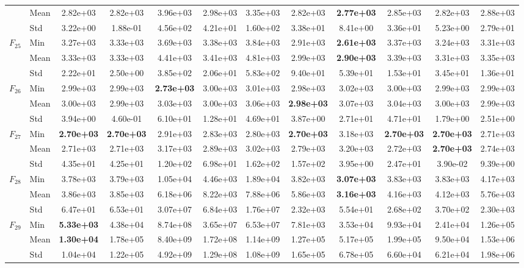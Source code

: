 \begin{center}
\begin{longtable}{clcccccccccc}
 & Mean & 2.82e+03 & 2.82e+03 & 3.96e+03 & 2.98e+03 & 3.35e+03 & 2.82e+03 & \textbf{2.77e+03} & 2.85e+03 & 2.82e+03 & 2.88e+03 \\
 & Std & 3.22e+00 & 1.88e-01 & 4.56e+02 & 4.21e+01 & 1.60e+02 & 3.38e+01 & 8.41e+00 & 3.36e+01 & 5.23e+00 & 2.79e+01 \\
\midrule
\multirow{3}{*}{$F_{25}$} & Min & 3.27e+03 & 3.33e+03 & 3.69e+03 & 3.38e+03 & 3.84e+03 & 2.91e+03 & \textbf{2.61e+03} & 3.37e+03 & 3.24e+03 & 3.31e+03 \\
 & Mean & 3.33e+03 & 3.33e+03 & 4.41e+03 & 3.41e+03 & 4.81e+03 & 2.99e+03 & \textbf{2.90e+03} & 3.39e+03 & 3.31e+03 & 3.35e+03 \\
 & Std & 2.22e+01 & 2.50e+00 & 3.85e+02 & 2.06e+01 & 5.83e+02 & 9.40e+01 & 5.39e+01 & 1.53e+01 & 3.45e+01 & 1.36e+01 \\
\midrule
\multirow{3}{*}{$F_{26}$} & Min & 2.99e+03 & 2.99e+03 & \textbf{2.73e+03} & 3.00e+03 & 3.01e+03 & 2.98e+03 & 3.02e+03 & 3.00e+03 & 2.99e+03 & 2.99e+03 \\
 & Mean & 3.00e+03 & 2.99e+03 & 3.03e+03 & 3.00e+03 & 3.06e+03 & \textbf{2.98e+03} & 3.07e+03 & 3.04e+03 & 3.00e+03 & 2.99e+03 \\
 & Std & 3.94e+00 & 4.60e-01 & 6.10e+01 & 1.28e+01 & 4.69e+01 & 3.87e+00 & 2.71e+01 & 4.71e+01 & 1.79e+00 & 2.51e+00 \\
\midrule
\multirow{3}{*}{$F_{27}$} & Min & \textbf{2.70e+03} & \textbf{2.70e+03} & 2.91e+03 & 2.83e+03 & 2.80e+03 & \textbf{2.70e+03} & 3.18e+03 & \textbf{2.70e+03} & \textbf{2.70e+03} & 2.71e+03 \\
 & Mean & 2.71e+03 & 2.71e+03 & 3.17e+03 & 2.89e+03 & 3.02e+03 & 2.79e+03 & 3.20e+03 & 2.72e+03 & \textbf{2.70e+03} & 2.74e+03 \\
 & Std & 4.35e+01 & 4.25e+01 & 1.20e+02 & 6.98e+01 & 1.62e+02 & 1.57e+02 & 3.95e+00 & 2.47e+01 & 3.90e-02 & 9.39e+00 \\
\midrule
\multirow{3}{*}{$F_{28}$} & Min & 3.78e+03 & 3.79e+03 & 1.05e+04 & 4.46e+03 & 1.89e+04 & 3.82e+03 & \textbf{3.07e+03} & 3.83e+03 & 3.83e+03 & 4.17e+03 \\
 & Mean & 3.86e+03 & 3.85e+03 & 6.18e+06 & 8.22e+03 & 7.88e+06 & 5.86e+03 & \textbf{3.16e+03} & 4.16e+03 & 4.12e+03 & 5.76e+03 \\
 & Std & 6.47e+01 & 6.53e+01 & 3.07e+07 & 6.84e+03 & 1.76e+07 & 2.32e+03 & 5.54e+01 & 2.68e+02 & 3.70e+02 & 2.30e+03 \\
\midrule
\multirow{3}{*}{$F_{29}$} & Min & \textbf{5.33e+03} & 4.38e+04 & 8.74e+08 & 3.65e+07 & 6.53e+07 & 7.81e+03 & 3.53e+04 & 9.93e+04 & 2.41e+04 & 1.26e+05 \\
 & Mean & \textbf{1.30e+04} & 1.78e+05 & 8.40e+09 & 1.72e+08 & 1.14e+09 & 1.27e+05 & 5.17e+05 & 1.99e+05 & 9.50e+04 & 1.53e+06 \\
 & Std & 1.04e+04 & 1.22e+05 & 4.92e+09 & 1.29e+08 & 1.08e+09 & 1.65e+05 & 6.78e+05 & 6.60e+04 & 6.21e+04 & 1.98e+06 \\
\bottomrule
\end{longtable}
\end{center}